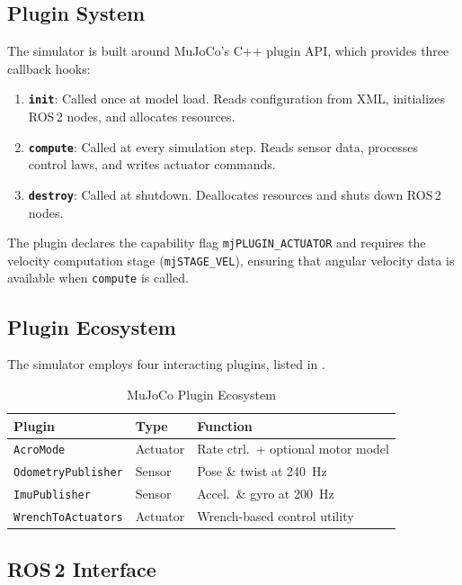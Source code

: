\documentclass[journal]{IEEEtran}
\begin{document}
\subsection{Plugin System}

The simulator is built around MuJoCo's C++ plugin API, which provides three callback hooks:
\begin{enumerate}
  \item \textbf{\texttt{init}}: Called once at model load. Reads configuration from XML, initializes ROS\,2 nodes, and allocates resources.
  \item \textbf{\texttt{compute}}: Called at every simulation step. Reads sensor data, processes control laws, and writes actuator commands.
  \item \textbf{\texttt{destroy}}: Called at shutdown. Deallocates resources and shuts down ROS\,2 nodes.
\end{enumerate}

The plugin declares the capability flag \texttt{mjPLUGIN\_ACTUATOR} and requires the velocity computation stage (\texttt{mjSTAGE\_VEL}), ensuring that angular velocity data is available when \texttt{compute} is called.

\subsection{Plugin Ecosystem}

The simulator employs four interacting plugins, listed in .

\begin{table}[!t]
  \centering
  \caption{MuJoCo Plugin Ecosystem}
  \label{tab:plugins}
  \begin{tabular}{@{}lll@{}}
    \toprule
    Plugin & Type & Function \\
    \midrule
    \texttt{AcroMode} & Actuator & Rate ctrl.\ + optional motor model \\
    \texttt{OdometryPublisher} & Sensor & Pose \& twist at \SI{240}{Hz} \\
    \texttt{ImuPublisher} & Sensor & Accel.\ \& gyro at \SI{200}{Hz} \\
    \texttt{WrenchToActuators} & Actuator & Wrench-based control utility \\
    \bottomrule
  \end{tabular}
\end{table}

\subsection{ROS\,2 Interface}
\end{document}
